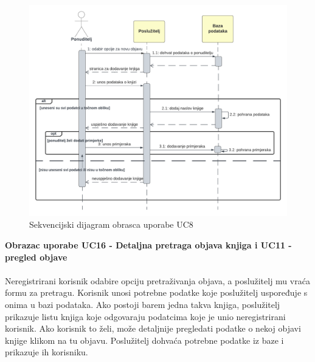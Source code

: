 				\begin{figure}[h]
					\centering
					\includegraphics[width = \textwidth]{slike/sekvUC8.PNG}
					\caption{Sekvencijski dijagram obrasca uporabe UC8}
					\label{fig:enter-label}
				\end{figure}
				\eject
				
				\textbf{Obrazac uporabe UC16 - Detaljna pretraga objava knjiga i UC11 - pregled objave}\\\\
				Neregistrirani korisnik odabire opciju pretraživanja objava, a poslužitelj mu vraća formu za pretragu. Korisnik unosi potrebne podatke koje poslužitelj uspoređuje s onima u bazi podataka. Ako postoji barem jedna takva knjiga, poslužitelj prikazuje listu knjiga koje odgovaraju podatcima koje je unio neregistrirani korisnik. Ako korisnik to želi, može detaljnije pregledati podatke o nekoj objavi knjige klikom na tu objavu. Poslužitelj dohvaća potrebne podatke iz baze i prikazuje ih korisniku.\\
				
